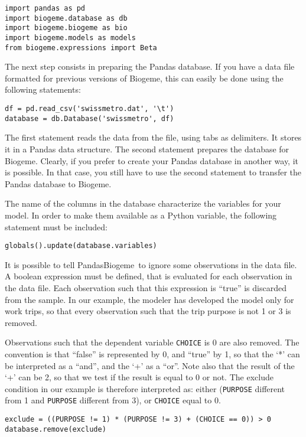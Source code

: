 \documentclass[12pt,a4paper]{article}
\newcommand{\PDBIOGEME}{PandasBiogeme}
\begin{document}
\begin{lstlisting}[style=nonumbers]
import pandas as pd
import biogeme.database as db
import biogeme.biogeme as bio
import biogeme.models as models
from biogeme.expressions import Beta
\end{lstlisting}

The next step consists in preparing the Pandas database. If you have
a data file formatted for previous versions of Biogeme,   this can easily be done using the
following statements:
\begin{lstlisting}[style=nonumbers]
df = pd.read_csv('swissmetro.dat', '\t')
database = db.Database('swissmetro', df)
\end{lstlisting}
The first statement reads the data from the file, using tabs as
delimiters. It stores it in a
Pandas data structure. The second statement prepares the database for
Biogeme. 
Clearly, if you prefer to create your Pandas database in another way,
it is possible. In that case, you still have to use the second statement to
transfer the Pandas database to Biogeme. 

The name of the columns in the database characterize the variables for
your model. In order to make them available as a Python variable, the
following statement must be included: 
\begin{lstlisting}[style=nonumbers]
globals().update(database.variables)
\end{lstlisting}

It is possible to tell \PDBIOGEME\ to ignore some
observations in the data file. A boolean expression must be defined, that
is evaluated for each observation in the data file.  Each observation
such that this expression is ``true'' is discarded from the
sample. In our example, the modeler has developed the model only for
work trips, so that every observation such that the trip purpose is not 1
or 3 is removed.

Observations such that the dependent variable \lstinline$CHOICE$ is 0 are also
removed. The convention is that ``false'' is represented by 0,
and ``true'' by 1, so that the `*' can be interpreted as a ``and'',
and the `+' as a ``or''. Note also that the result of the `+' can be
2, so that we test if the result is equal to 0 or not. The exclude condition in our example is
therefore interpreted as: either (\lstinline$PURPOSE$ different from 1
and \lstinline$PURPOSE$ different from 3), or \lstinline$CHOICE$ equal
to 0. 

\begin{lstlisting}[style=nonumbers]
exclude = ((PURPOSE != 1) * (PURPOSE != 3) + (CHOICE == 0)) > 0
database.remove(exclude)
\end{lstlisting}
\end{document}
